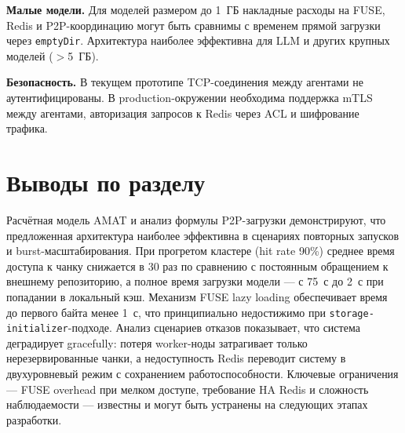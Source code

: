 \textbf{Малые модели.} Для моделей размером до 1~ГБ накладные расходы на FUSE, Redis и P2P-координацию могут быть сравнимы с временем прямой загрузки через \texttt{emptyDir}. Архитектура наиболее эффективна для LLM и других крупных моделей ($>$5~ГБ).

\textbf{Безопасность.} В текущем прототипе TCP-соединения между агентами не аутентифицированы. В production-окружении необходима поддержка mTLS между агентами, авторизация запросов к Redis через ACL и шифрование трафика.

\section{Выводы по разделу}

Расчётная модель AMAT и анализ формулы P2P-загрузки демонстрируют, что предложенная архитектура наиболее эффективна в сценариях повторных запусков и burst-масштабирования. При прогретом кластере (hit rate 90\%) среднее время доступа к чанку снижается в 30 раз по сравнению с постоянным обращением к внешнему репозиторию, а полное время загрузки модели --- с 75~с до 2~с при попадании в локальный кэш. Механизм FUSE lazy loading обеспечивает время до первого байта менее 1~с, что принципиально недостижимо при \texttt{storage-initializer}-подходе. Анализ сценариев отказов показывает, что система деградирует gracefully: потеря worker-ноды затрагивает только нерезервированные чанки, а недоступность Redis переводит систему в двухуровневый режим с сохранением работоспособности. Ключевые ограничения --- FUSE overhead при мелком доступе, требование HA Redis и сложность наблюдаемости --- известны и могут быть устранены на следующих этапах разработки.
